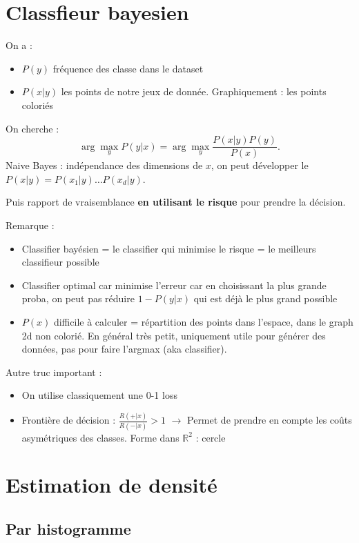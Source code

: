 \documentclass{article}
\theoremstyle{plain}%
\theoremstyle{definition}
\theoremstyle{remark}
\begin{document}
\section{Classfieur bayesien}
On a : 
\begin{itemize}
    \item $ P(y) $ fréquence des classe dans le dataset
    \item $ P(x|y) $ les points de notre jeux de donnée. Graphiquement : les points coloriés
\end{itemize}
On cherche : 
\[
    \arg \max _y P(y|x) = \arg \max _y \frac{P(x|y) P(y)}{P(x)}
.\]
Naive Bayes : indépendance des dimensions de $ x $, on peut développer le $ P(x|y) = P(x_1|y) \dots P(x_d|y) $.

Puis rapport de vraisemblance \textbf{en utilisant le risque} pour prendre la décision.

Remarque : 
\begin{itemize}
    \item Classifier bayésien = le classifier qui minimise le risque = le meilleurs classifieur possible
    \item Classifier optimal car minimise l'erreur car en choisissant la plus grande proba, on peut pas réduire $ 1 - P(y | x) $ qui est déjà le plus grand possible  
    \item $ P(x) $ difficile à calculer = répartition des points dans l'espace, dans le graph 2d non colorié. En général très petit, uniquement utile pour générer des données, pas pour faire l'argmax (aka classifier).
\end{itemize}
Autre truc important : 
\begin{itemize}
    \item On utilise classiquement une 0-1 loss
    \item Frontière de décision : $ \frac{R(+|x)}{R(-|x)} > 1 $  $\rightarrow$ Permet de prendre en compte les coûts asymétriques des classes. Forme dans $ \mathbb{R}^2 $ : cercle
\end{itemize}

\section{Estimation de densité}
\subsection{Par histogramme}
\end{document}

